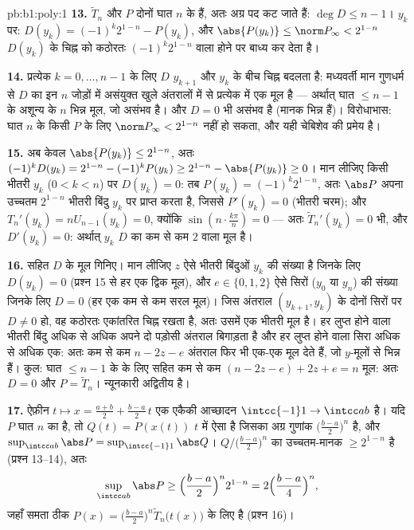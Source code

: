\begin{solution}{pb:b1:poly:1}
\textbf{13.} $\widetilde T_n$ और $P$ दोनों घात $n$ के  हैं, अतः
अग्र पद कट जाते हैं: $\deg D \leq n - 1$। $y_k$ पर: $D(y_k) = (-1)^k2^{1-n}
- P(y_k)$, और $\abs{P(y_k)} \leq \norm P_\infty < 2^{1-n}$ $D(y_k)$ के चिह्न
को कठोरतः $(-1)^k2^{1-n}$ वाला होने पर बाध्य कर देता है।

\textbf{14.} प्रत्येक $k = 0, \dots, n-1$ के लिए $D$ $y_{k+1}$ और $y_k$ के
बीच चिह्न बदलता है: मध्यवर्ती मान गुणधर्म से $D$ का इन $n$ जोड़ों में
असंयुक्त खुले अंतरालों में से प्रत्येक में एक मूल है --- अर्थात् घात $\leq n
- 1$ के अशून्य  के $n$ भिन्न मूल, जो असंभव है। और $D = 0$ भी असंभव है
(मानक भिन्न हैं)। विरोधाभास: घात $n$ के किसी  $P$ के लिए $\norm
P_\infty < 2^{1-n}$ नहीं हो सकता, और यही चेबिशेव की प्रमेय है।

\textbf{15.} अब केवल $\abs{P(y_k)} \leq 2^{1-n}$, अतः $(-1)^k D(y_k) =
2^{1-n} - (-1)^kP(y_k) \geq 2^{1-n} - \abs{P(y_k)} \geq 0$। मान लीजिए किसी
भीतरी $y_k$ ($0 < k < n$) पर $D(y_k) = 0$: तब $P(y_k) = (-1)^k2^{1-n}$, अतः
$\abs P$ अपना उच्चतम $2^{1-n}$ भीतरी बिंदु $y_k$ पर प्राप्त करता है, जिससे
$P'(y_k) = 0$ (भीतरी चरम); और $T_n'(y_k) = nU_{n-1}(y_k) = 0$, क्योंकि
$\sin(n\cdot\frac{k\pi}n) = 0$ --- अतः $\widetilde T_n'(y_k) = 0$ भी, और
$D'(y_k) = 0$: अर्थात् $y_k$ $D$ का कम से कम  $2$ वाला मूल है।

\textbf{16.}  सहित $D$ के मूल गिनिए। मान लीजिए $z$ ऐसे भीतरी बिंदुओं
$y_k$ की संख्या है जिनके लिए $D(y_k) = 0$ (प्रश्न 15 से हर एक द्विक मूल), और
$e \in \{0, 1, 2\}$ ऐसे सिरों ($y_0$ या $y_n$) की संख्या जिनके लिए $D = 0$
(हर एक कम से कम सरल मूल)। जिस अंतराल $(y_{k+1}, y_k)$ के दोनों सिरों पर $D
\neq 0$ हो, वह कठोरतः एकांतरित चिह्न रखता है, अतः उसमें एक भीतरी मूल है। हर
लुप्त होने वाला भीतरी बिंदु अधिक से अधिक अपने दो पड़ोसी अंतराल बिगाड़ता है
और हर लुप्त होने वाला सिरा अधिक से अधिक एक: अतः कम से कम $n - 2z - e$ अंतराल
फिर भी एक-एक मूल देते हैं, जो $y$-मूलों से भिन्न हैं। कुल: घात $\leq n - 1$
के  के लिए  सहित कम से कम $(n - 2z - e) + 2z + e = n$ मूल: अतः $D
= 0$ और $P = \widetilde T_n$। न्यूनकारी अद्वितीय है।

\textbf{17.} ऐफ़ीन  $t \mapsto x = \frac{a+b}2 + \frac{b-a}2\,t$
एक एकैकी आच्छादन $\intcc{-1}1 \to \intcc ab$ है। यदि $P$ घात $n$ का
 है, तो $Q(t) = P(x(t))$ $t$ में ऐसा  है जिसका अग्र गुणांक
$\bigl(\frac{b-a}2\bigr)^n$ है, और $\sup_{\intcc ab}\abs P =
\sup_{\intcc{-1}1}\abs Q$।  $Q/\bigl(\frac{b-a}2\bigr)^n$ का
उच्चतम-मानक $\geq 2^{1-n}$ है (प्रश्न 13--14), अतः
\[
\sup_{\intcc ab}\abs P \geq \Bigl(\frac{b-a}2\Bigr)^n 2^{1-n}
= 2\Bigl(\frac{b-a}4\Bigr)^n ,
\]
जहाँ समता ठीक $P(x) = \bigl(\frac{b-a}2\bigr)^n \widetilde
T_n\bigl(t(x)\bigr)$ के लिए है (प्रश्न 16)।


\end{solution}
